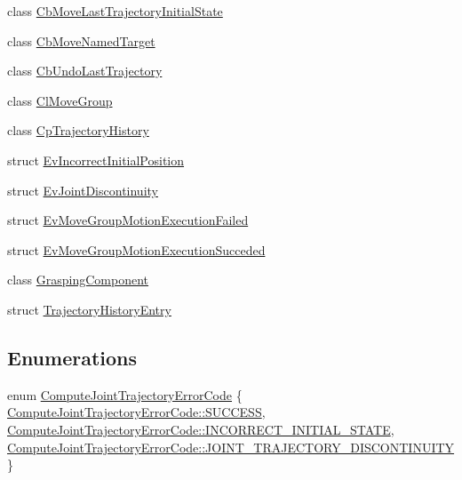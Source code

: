 \begin{DoxyCompactItemize}
class \hyperlink{classcl__move__group__interface_1_1CbMoveLastTrajectoryInitialState}{Cb\+Move\+Last\+Trajectory\+Initial\+State}
\item 
class \hyperlink{classcl__move__group__interface_1_1CbMoveNamedTarget}{Cb\+Move\+Named\+Target}
\item 
class \hyperlink{classcl__move__group__interface_1_1CbUndoLastTrajectory}{Cb\+Undo\+Last\+Trajectory}
\item 
class \hyperlink{classcl__move__group__interface_1_1ClMoveGroup}{Cl\+Move\+Group}
\item 
class \hyperlink{classcl__move__group__interface_1_1CpTrajectoryHistory}{Cp\+Trajectory\+History}
\item 
struct \hyperlink{structcl__move__group__interface_1_1EvIncorrectInitialPosition}{Ev\+Incorrect\+Initial\+Position}
\item 
struct \hyperlink{structcl__move__group__interface_1_1EvJointDiscontinuity}{Ev\+Joint\+Discontinuity}
\item 
struct \hyperlink{structcl__move__group__interface_1_1EvMoveGroupMotionExecutionFailed}{Ev\+Move\+Group\+Motion\+Execution\+Failed}
\item 
struct \hyperlink{structcl__move__group__interface_1_1EvMoveGroupMotionExecutionSucceded}{Ev\+Move\+Group\+Motion\+Execution\+Succeded}
\item 
class \hyperlink{classcl__move__group__interface_1_1GraspingComponent}{Grasping\+Component}
\item 
struct \hyperlink{structcl__move__group__interface_1_1TrajectoryHistoryEntry}{Trajectory\+History\+Entry}
\end{DoxyCompactItemize}
\subsection*{Enumerations}
\begin{DoxyCompactItemize}
\item 
enum \hyperlink{namespacecl__move__group__interface_ae5fc1caf9a16ae5ad1c97c2e137a7017}{Compute\+Joint\+Trajectory\+Error\+Code} \{ \hyperlink{namespacecl__move__group__interface_ae5fc1caf9a16ae5ad1c97c2e137a7017ad0749aaba8b833466dfcbb0428e4f89c}{Compute\+Joint\+Trajectory\+Error\+Code\+::\+S\+U\+C\+C\+E\+SS}, 
\hyperlink{namespacecl__move__group__interface_ae5fc1caf9a16ae5ad1c97c2e137a7017a1b748367c8d468cb9b65ecd6b2eab32c}{Compute\+Joint\+Trajectory\+Error\+Code\+::\+I\+N\+C\+O\+R\+R\+E\+C\+T\+\_\+\+I\+N\+I\+T\+I\+A\+L\+\_\+\+S\+T\+A\+TE}, 
\hyperlink{namespacecl__move__group__interface_ae5fc1caf9a16ae5ad1c97c2e137a7017a3e86842785cd7c42003e516418347c8e}{Compute\+Joint\+Trajectory\+Error\+Code\+::\+J\+O\+I\+N\+T\+\_\+\+T\+R\+A\+J\+E\+C\+T\+O\+R\+Y\+\_\+\+D\+I\+S\+C\+O\+N\+T\+I\+N\+U\+I\+TY}
 \}
\end{DoxyCompactItemize}
